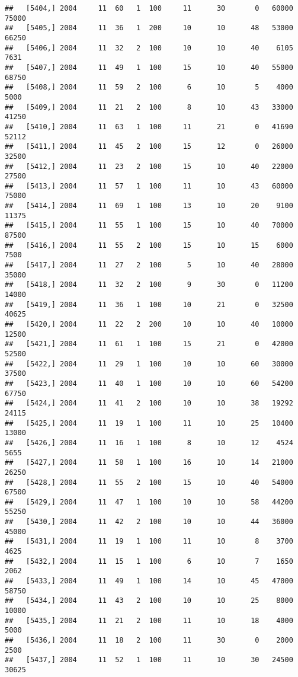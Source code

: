 \documentclass{article}\usepackage[]{graphicx}\usepackage[]{color}
\makeatletter
\newenvironment{kframe}{%
 \def\at@end@of@kframe{}%
 \ifinner\ifhmode%
  \def\at@end@of@kframe{\end{minipage}}%
  \begin{minipage}{\columnwidth}%
 \fi\fi%
 \def\FrameCommand##1{\hskip\@totalleftmargin \hskip-\fboxsep
 \colorbox{shadecolor}{##1}\hskip-\fboxsep
     \hskip-\linewidth \hskip-\@totalleftmargin \hskip\columnwidth}%
 \MakeFramed {\advance\hsize-\width
   \@totalleftmargin\z@ \linewidth\hsize
   \@setminipage}}%
 {\par\unskip\endMakeFramed%
 \at@end@of@kframe}
\newenvironment{knitrout}{}{} %
\makeatother
\begin{document}
\begin{knitrout}
\begin{kframe}
\begin{verbatim}
##   [5404,] 2004     11  60   1  100     11      30       0   60000   75000
##   [5405,] 2004     11  36   1  200     10      10      48   53000   66250
##   [5406,] 2004     11  32   2  100     10      10      40    6105    7631
##   [5407,] 2004     11  49   1  100     15      10      40   55000   68750
##   [5408,] 2004     11  59   2  100      6      10       5    4000    5000
##   [5409,] 2004     11  21   2  100      8      10      43   33000   41250
##   [5410,] 2004     11  63   1  100     11      21       0   41690   52112
##   [5411,] 2004     11  45   2  100     15      12       0   26000   32500
##   [5412,] 2004     11  23   2  100     15      10      40   22000   27500
##   [5413,] 2004     11  57   1  100     11      10      43   60000   75000
##   [5414,] 2004     11  69   1  100     13      10      20    9100   11375
##   [5415,] 2004     11  55   1  100     15      10      40   70000   87500
##   [5416,] 2004     11  55   2  100     15      10      15    6000    7500
##   [5417,] 2004     11  27   2  100      5      10      40   28000   35000
##   [5418,] 2004     11  32   2  100      9      30       0   11200   14000
##   [5419,] 2004     11  36   1  100     10      21       0   32500   40625
##   [5420,] 2004     11  22   2  200     10      10      40   10000   12500
##   [5421,] 2004     11  61   1  100     15      21       0   42000   52500
##   [5422,] 2004     11  29   1  100     10      10      60   30000   37500
##   [5423,] 2004     11  40   1  100     10      10      60   54200   67750
##   [5424,] 2004     11  41   2  100     10      10      38   19292   24115
##   [5425,] 2004     11  19   1  100     11      10      25   10400   13000
##   [5426,] 2004     11  16   1  100      8      10      12    4524    5655
##   [5427,] 2004     11  58   1  100     16      10      14   21000   26250
##   [5428,] 2004     11  55   2  100     15      10      40   54000   67500
##   [5429,] 2004     11  47   1  100     10      10      58   44200   55250
##   [5430,] 2004     11  42   2  100     10      10      44   36000   45000
##   [5431,] 2004     11  19   1  100     11      10       8    3700    4625
##   [5432,] 2004     11  15   1  100      6      10       7    1650    2062
##   [5433,] 2004     11  49   1  100     14      10      45   47000   58750
##   [5434,] 2004     11  43   2  100     10      10      25    8000   10000
##   [5435,] 2004     11  21   2  100     11      10      18    4000    5000
##   [5436,] 2004     11  18   2  100     11      30       0    2000    2500
##   [5437,] 2004     11  52   1  100     11      10      30   24500   30625

\end{verbatim}
\end{kframe}
\end{knitrout}
\end{document}
